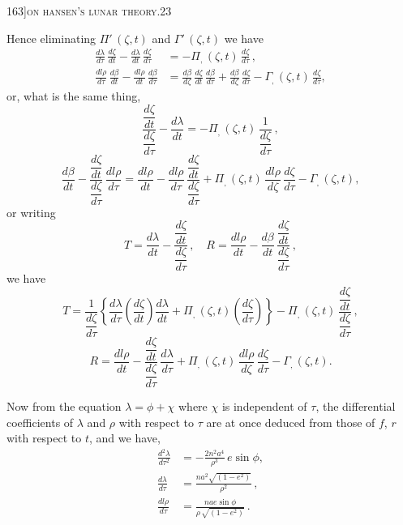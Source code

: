 \documentclass[11pt]{article}
\begin{document}
\newpage

\begin{center}
\small 163]\hfill\textsc{on hansen's lunar theory.}\hfill\textsc{23}
\end{center}

\medskip

\noindent Hence eliminating $\Pi'\,(\zeta, t)$ and $\Gamma'\,(\zeta, t)$ we have
\begin{align*}
\frac{d\lambda}{d\tau}\,\frac{d\zeta}{dt} - \frac{d\lambda}{dt}\,\frac{d\zeta}{d\tau} &= -\Pi_{,}\,(\zeta, t)\,\frac{d\zeta}{d\tau}\,,\\
\frac{dl\rho}{d\tau}\,\frac{d\beta}{dt} - \frac{dl\rho}{dt}\,\frac{d\beta}{d\tau} &= \frac{d\beta}{d\zeta}\,\frac{d\zeta}{dt}\,\frac{d\beta}{d\tau} + \frac{d\beta}{d\zeta}\,\frac{d\zeta}{d\tau} - \Gamma_{,}\,(\zeta, t)\,\frac{d\zeta}{d\tau},
\end{align*}
or, what is the same thing,
\[
\frac{\dfrac{d\zeta}{dt}}{\dfrac{d\zeta}{d\tau}} - \frac{d\lambda}{dt} = -\Pi_{,}\,(\zeta, t)\,\frac{1}{\dfrac{d\zeta}{d\tau}}\,,
\]
\[
\frac{d\beta}{dt} - \frac{\dfrac{d\zeta}{dt}}{\dfrac{d\zeta}{d\tau}}\,\frac{dl\rho}{d\tau} = \frac{dl\rho}{dt} - \frac{dl\rho}{d\tau}\,\frac{\dfrac{d\zeta}{dt}}{\dfrac{d\zeta}{d\tau}} + \Pi_{,}\,(\zeta, t)\,\frac{dl\rho}{d\zeta}\,\frac{d\zeta}{d\tau} - \Gamma_{,}\,(\zeta, t),
\]
or writing
\[
T = \frac{d\lambda}{dt} - \frac{\dfrac{d\zeta}{dt}}{\dfrac{d\zeta}{d\tau}}\,,\quad R = \frac{dl\rho}{dt} - \frac{d\beta}{dt}\,\frac{\dfrac{d\zeta}{dt}}{\dfrac{d\zeta}{d\tau}}\,,
\]
we have
\[
T = \frac{1}{\dfrac{d\zeta}{d\tau}}\!\left\{\dfrac{d\lambda}{d\tau}\!\left(\dfrac{d\zeta}{dt}\right)\dfrac{d\lambda}{dt} + \Pi_{,}\,(\zeta, t)\!\left(\dfrac{d\zeta}{d\tau}\right)\right\} - \Pi_{,}\,(\zeta, t)\,\frac{\dfrac{d\zeta}{dt}}{\dfrac{d\zeta}{d\tau}}\,,
\]
\[
R = \frac{dl\rho}{dt} - \frac{\dfrac{d\zeta}{dt}}{\dfrac{d\zeta}{d\tau}}\,\frac{d\lambda}{d\tau} + \Pi_{,}\,(\zeta, t)\,\frac{dl\rho}{d\zeta}\,\frac{d\zeta}{d\tau} - \Gamma_{,}\,(\zeta, t).
\]

Now from the equation $\lambda = \phi + \chi$ where $\chi$ is independent of $\tau$, the differential
coefficients of $\lambda$ and $\rho$ with respect to $\tau$ are at once deduced from those of $f$, $r$
with respect to $t$, and we have,
\begin{align*}
\frac{d^{2}\lambda}{d\tau^{2}} &= -\frac{2n^{2}a^{4}}{\rho^{3}}\,e\sin\phi,\\
\frac{d\lambda}{d\tau} &= \frac{na^{2}\sqrt{(1-e^{2})}}{\rho^{2}}\,,\\
\frac{dl\rho}{d\tau} &= \frac{nae\sin\phi}{\rho\,\sqrt{(1-e^{2})}}\,.
\end{align*}
\end{document}
